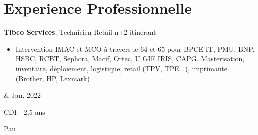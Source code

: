 \documentclass[10pt, letterpaper]{article}
\newenvironment{highlights}{
        \begin{itemize}[
                topsep=0pt,
                parsep=0.10 cm,
                partopsep=0pt,
                itemsep=0pt,
                after=\vspace{-1\baselineskip},
                leftmargin=0.4 cm + 3pt
            ]
    }{
        \end{itemize}
    } %
\let\originalTabularx\tabularx
\let\originalEndTabularx\endtabularx
\renewenvironment{tabularx}{\bgroup\centering\originalTabularx}{\originalEndTabularx\par\egroup}
\begin{document}
\section{Experience Professionnelle}

\begin{tabularx}{
	\textwidth-0.4 cm-0.13cm
	}{
	K{0.2 cm}
	R{4.1 cm}
	}
	\textbf{Tibco Services}, Technicien Retail n+2 itinérant
	
	\vspace{0.10 cm}
	
	\begin{highlights}
	\item Intervention IMAC et MCO à travers le 64 et 65 pour BPCE-IT, PMU, BNP, HSBC, RCBT, Sephora, Macif, Ortec, U GIE IRIS, CAPG. Masterisation, inventaire, déploiement, logistique, retail (TPV, TPE...), imprimante (Brother, HP, Lexmark) 
	\end{highlights}
	  &   
	Jan. 2022
	            
	CDI - 2,5 ans
	            
	Pau
\end{tabularx}
\end{document}
